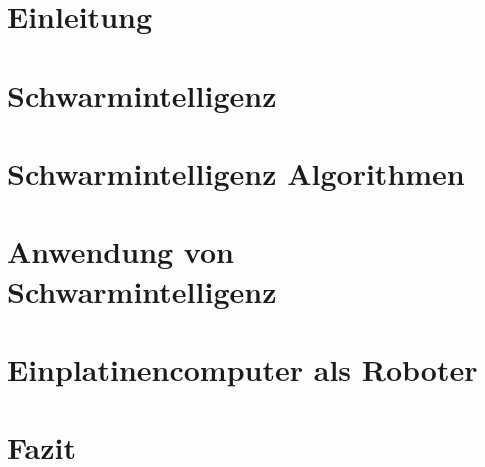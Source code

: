 \documentclass[12pt, a4paper]{report}
\begin{document}


\tableofcontents
\listoffigures
\listoftables
\listoflistings
\chapter{Einleitung}

\chapter{Schwarmintelligenz}

\chapter{Schwarmintelligenz Algorithmen}

\chapter{Anwendung von Schwarmintelligenz}

\chapter{Einplatinencomputer als Roboter}

\chapter{Fazit}


\printbibliography
\end{document}
